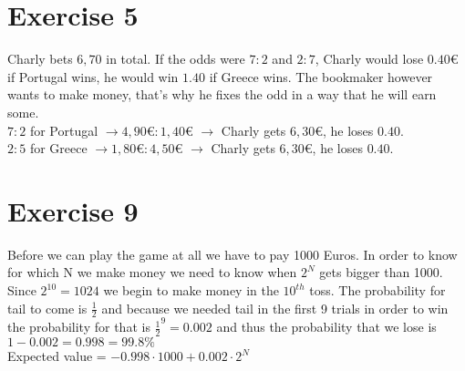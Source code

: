 \section*{Exercise 5}
Charly bets $6,70$ in total.
If the odds were $7 : 2$ and $2 : 7$, Charly would lose $0.40€$ if Portugal wins, he would win $1.40$ if Greece wins. The bookmaker however wants to make money, that's why he fixes the odd in a way that he will earn some.\\
$7 : 2$ for Portugal $\rightarrow 4,90€ : 1,40€$ $\rightarrow$ Charly gets $6,30€$, he loses $0.40$.\\
$2 : 5$ for Greece $\rightarrow 1,80€ : 4,50€$ $\rightarrow$ Charly gets $6,30€$, he loses $0.40$.

\section*{Exercise 9}
Before we can play the game at all we have to pay 1000 Euros. In order to know for which N we make money we need to know when $2^{N}$ gets bigger than 1000. Since $2^{10} = 1024$ we begin to make money in the $10^{th}$ toss.
The probability for tail to come is $\frac{1}{2}$ and because we needed tail in the first 9 trials in order to win the probability for that is $\frac{1}{2}^{9} = 0.002$ and thus the probability that we lose is $1-0.002 = 0.998 = 99.8\%$ \\
Expected value = $-0.998\cdot 1000 + 0.002\cdot 2^{N}$ 



